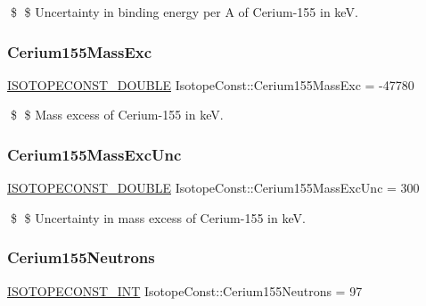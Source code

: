 \$ \$ Uncertainty in binding energy per A of Cerium-\/155 in keV. \mbox{\label{group___isotope_const-_cerium-_ce155_ga33e4dfb9c826c327aa369e4997dac170}} 
\subsubsection{\texorpdfstring{Cerium155\+Mass\+Exc}{Cerium155MassExc}}
{\footnotesize\ttfamily \mbox{\hyperlink{group___isotope_const-_macros_ga8f45a7272ce02c0b4c65c44636ed719a}{I\+S\+O\+T\+O\+P\+E\+C\+O\+N\+S\+T\+\_\+\+D\+O\+U\+B\+LE}} Isotope\+Const\+::\+Cerium155\+Mass\+Exc = -\/47780}

\$ \$ Mass excess of Cerium-\/155 in keV. \mbox{\label{group___isotope_const-_cerium-_ce155_ga97625a1528128cf039b8f7db3e4244ce}} 
\subsubsection{\texorpdfstring{Cerium155\+Mass\+Exc\+Unc}{Cerium155MassExcUnc}}
{\footnotesize\ttfamily \mbox{\hyperlink{group___isotope_const-_macros_ga8f45a7272ce02c0b4c65c44636ed719a}{I\+S\+O\+T\+O\+P\+E\+C\+O\+N\+S\+T\+\_\+\+D\+O\+U\+B\+LE}} Isotope\+Const\+::\+Cerium155\+Mass\+Exc\+Unc = 300}

\$ \$ Uncertainty in mass excess of Cerium-\/155 in keV. \mbox{\label{group___isotope_const-_cerium-_ce155_ga23a6b92a2171f30f4895f36ec01e4354}} 
\subsubsection{\texorpdfstring{Cerium155\+Neutrons}{Cerium155Neutrons}}
{\footnotesize\ttfamily \mbox{\hyperlink{group___isotope_const-_macros_ga5f18360b3e99483a35c32d789e62621c}{I\+S\+O\+T\+O\+P\+E\+C\+O\+N\+S\+T\+\_\+\+I\+NT}} Isotope\+Const\+::\+Cerium155\+Neutrons = 97}

